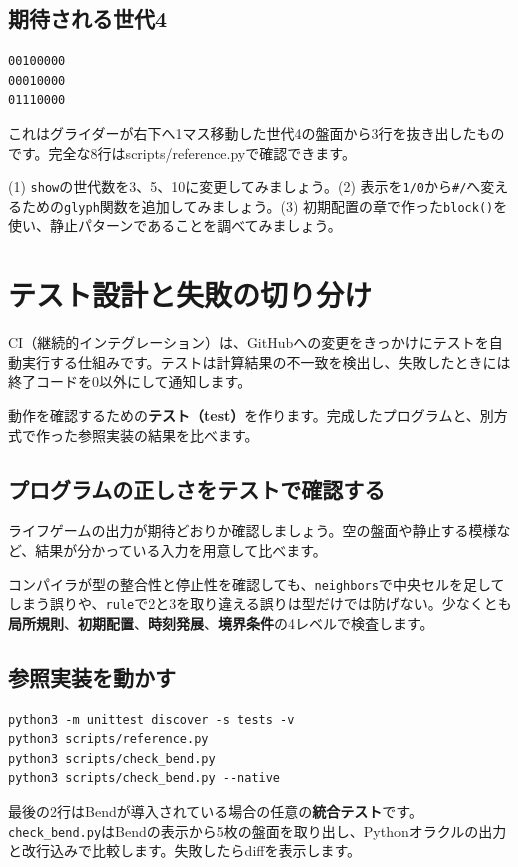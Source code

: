 \documentclass[11pt,a4paper,openany]{book}
\newcommand{\code}[1]{\texttt{#1}}
\newcommand{\file}[1]{\textsf{\color{blue}#1}}
\newcommand{\term}[1]{\textbf{#1}}
\newcommand{\exercise}[1]{\begin{exercisebox}#1\end{exercisebox}}
\begin{document}
\section{期待される世代4}
\begin{lstlisting}[language={},numbers=none,caption={Python参照実装が算出した世代4の一部}]
00100000
00010000
01110000
\end{lstlisting}
これはグライダーが右下へ1マス移動した世代4の盤面から3行を抜き出したものです。完全な8行は\file{scripts/reference.py}で確認できます。

\exercise{(1) \code{show}の世代数を3、5、10に変更してみましょう。(2) 表示を\code{1/0}から\code{\#/\.}へ変えるための\code{glyph}関数を追加してみましょう。(3) 初期配置の章で作った\code{block()}を使い、静止パターンであることを調べてみましょう。}

\chapter{テスト設計と失敗の切り分け}
\begin{pointbox}CI（継続的インテグレーション）は、GitHubへの変更をきっかけにテストを自動実行する仕組みです。テストは計算結果の不一致を検出し、失敗したときには終了コードを0以外にして通知します。\end{pointbox}

\begin{tcolorbox}[colback=blue!3,colframe=blue!16,boxrule=.35pt,arc=1mm,left=3mm,right=3mm,top=2mm,bottom=2mm]
\small 動作を確認するための\term{テスト（test）}を作ります。完成したプログラムと、別方式で作った参照実装の結果を比べます。
\end{tcolorbox}

\section{プログラムの正しさをテストで確認する}
ライフゲームの出力が期待どおりか確認しましょう。空の盤面や静止する模様など、結果が分かっている入力を用意して比べます。

コンパイラが型の整合性と停止性を確認しても、\code{neighbors}で中央セルを足してしまう誤りや、\code{rule}で2と3を取り違える誤りは型だけでは防げない。少なくとも\term{局所規則}、\term{初期配置}、\term{時刻発展}、\term{境界条件}の4レベルで検査します。

\section{参照実装を動かす}
\begin{lstlisting}[language={},caption={付属のPython独立テスト（標準ライブラリのみ）}]
python3 -m unittest discover -s tests -v
python3 scripts/reference.py
python3 scripts/check_bend.py
python3 scripts/check_bend.py --native
\end{lstlisting}
最後の2行はBendが導入されている場合の任意の\term{統合テスト}です。\code{check\_bend.py}はBendの表示から5枚の盤面を取り出し、Pythonオラクルの出力と改行込みで比較します。失敗したらdiffを表示します。
\end{document}
